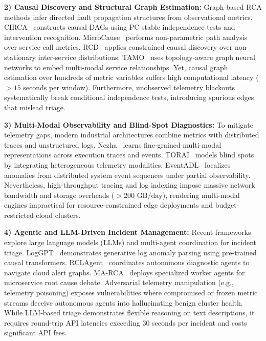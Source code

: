 \documentclass[conference]{IEEEtran}
\begin{document}
\textbf{2) Causal Discovery and Structural Graph Estimation:} Graph-based RCA methods infer directed fault propagation structures from observational metrics.
CIRCA~\cite{li2022circa} constructs causal DAGs using PC-stable independence tests and intervention recognition.
MicroCause~\cite{meng2020microcause} performs non-parametric path analysis over service call metrics.
RCD~\cite{ikram2022rcd} applies constrained causal discovery over non-stationary inter-service distributions.
TAMO~\cite{chen2025tamo} uses topology-aware graph neural networks to embed multi-modal service relationships.
Yet, causal graph estimation over hundreds of metric variables suffers high computational latency ($>15$ seconds per window).
Furthermore, unobserved telemetry blackouts systematically break conditional independence tests, introducing spurious edges that mislead triage.

\textbf{3) Multi-Modal Observability and Blind-Spot Diagnostics:} To mitigate telemetry gaps, modern industrial architectures combine metrics with distributed traces and unstructured logs.
Nezha~\cite{yu2023nezha} learns fine-grained multi-modal representations across execution traces and events.
TORAI~\cite{pham2026torai} models blind spots by integrating heterogeneous telemetry modalities.
EventADL~\cite{li2026eventadl} localizes anomalies from distributed system event sequences under partial observability.
Nevertheless, high-throughput tracing and log indexing impose massive network bandwidth and storage overheads ($>200\text{ GB/day}$), rendering multi-modal engines impractical for resource-constrained edge deployments and budget-restricted cloud clusters.

\textbf{4) Agentic and LLM-Driven Incident Management:} Recent frameworks explore large language models (LLMs) and multi-agent coordination for incident triage.
LogGPT~\cite{qi2023loggpt} demonstrates generative log anomaly parsing using pre-trained causal transformers.
RCLAgent~\cite{wang2026rclagent} coordinates autonomous diagnostic agents to navigate cloud alert graphs.
MA-RCA~\cite{zhang2026marca} deploys specialized worker agents for microservice root cause debate.
Adversarial telemetry manipulation (e.g., telemetry poisoning) exposes vulnerabilities where compromised or frozen metric streams deceive autonomous agents into hallucinating benign cluster health.
While LLM-based triage demonstrates flexible reasoning on text descriptions, it requires round-trip API latencies exceeding 30 seconds per incident and costs significant API fees.
\end{document}
